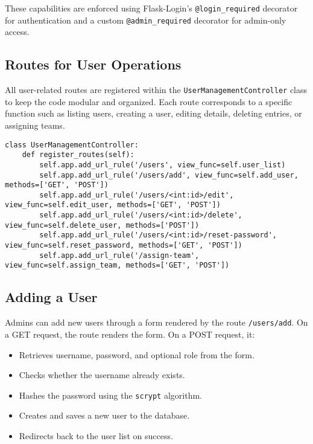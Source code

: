 \documentclass[12pt]{article}
\begin{document}
\noindent These capabilities are enforced using Flask-Login's \texttt{@login\_required} decorator for authentication and a custom \texttt{@admin\_required} decorator for admin-only access.

\subsection*{Routes for User Operations}

All user-related routes are registered within the \texttt{UserManagementController} class to keep the code modular and organized. Each route corresponds to a specific function such as listing users, creating a user, editing details, deleting entries, or assigning teams.

\begin{verbatim}
class UserManagementController:
    def register_routes(self):
        self.app.add_url_rule('/users', view_func=self.user_list)
        self.app.add_url_rule('/users/add', view_func=self.add_user, methods=['GET', 'POST'])
        self.app.add_url_rule('/users/<int:id>/edit', view_func=self.edit_user, methods=['GET', 'POST'])
        self.app.add_url_rule('/users/<int:id>/delete', view_func=self.delete_user, methods=['POST'])
        self.app.add_url_rule('/users/<int:id>/reset-password', view_func=self.reset_password, methods=['GET', 'POST'])
        self.app.add_url_rule('/assign-team', view_func=self.assign_team, methods=['GET', 'POST'])
\end{verbatim}

\subsection*{Adding a User}

Admins can add new users through a form rendered by the route \texttt{/users/add}. On a GET request, the route renders the form. On a POST request, it:
\newpage
\begin{itemize}
  \item Retrieves username, password, and optional role from the form.
  \item Checks whether the username already exists.
  \item Hashes the password using the \texttt{scrypt} algorithm.
  \item Creates and saves a new user to the database.
  \item Redirects back to the user list on success.
\end{itemize}
\end{document}
